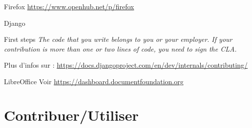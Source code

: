\documentclass{beamer}
\begin{document}
\begin{frame}[plain]%
%  
\end{frame}

\begin{frame}{Firefox}
  \url{https://www.openhub.net/p/firefox}
\end{frame}

\begin{frame}{Django}

  \begin{block}{First steps}
    \textit{The code that you write belongs to you or your employer. If your contribution is more than one or two lines of code, you need to sign the CLA.}
  \end{block}

  Plus d'infos sur : \url{https://docs.djangoproject.com/en/dev/internals/contributing/}
\end{frame}


\begin{frame}{LibreOffice}
  Voir \url{https://dashboard.documentfoundation.org}
\end{frame}

\section{Contribuer/Utiliser}
\end{document}
